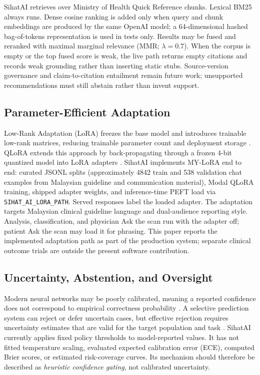 \documentclass[conference]{IEEEtran}
\begin{document}
SihatAI retrieves over Ministry of Health Quick Reference chunks. Lexical BM25 always runs. Dense cosine ranking is added only when query and chunk embeddings are produced by the same OpenAI model; a 64-dimensional hashed bag-of-tokens representation is used in tests only. Results may be fused and reranked with maximal marginal relevance (MMR; \(\lambda=0.7\)). When the corpus is empty or the top fused score is weak, the live path returns empty citations and records weak grounding rather than inserting static stubs. Source-version governance and claim-to-citation entailment remain future work; unsupported recommendations must still abstain rather than invent support.

\subsection{Parameter-Efficient Adaptation}

Low-Rank Adaptation (LoRA) freezes the base model and introduces trainable low-rank matrices, reducing trainable parameter count and deployment storage \cite{hu2022lora}. QLoRA extends this approach by back-propagating through a frozen 4-bit quantized model into LoRA adapters \cite{dettmers2023qlora}. SihatAI implements MY-LoRA end to end: curated JSONL splits (approximately 4842 train and 538 validation chat examples from Malaysian guideline and communication material), Modal QLoRA training, shipped adapter weights, and inference-time PEFT load via \texttt{SIHAT\_AI\_LORA\_PATH}. Served responses label the loaded adapter. The adaptation targets Malaysian clinical guideline language and dual-audience reporting style. Analysis, classification, and physician Ask the scan run with the adapter off; patient Ask the scan may load it for phrasing. This paper reports the implemented adaptation path as part of the production system; separate clinical outcome trials are outside the present software contribution.

\subsection{Uncertainty, Abstention, and Oversight}

Modern neural networks may be poorly calibrated, meaning a reported confidence does not correspond to empirical correctness probability \cite{guo2017calibration}. A selective prediction system can reject or defer uncertain cases, but effective rejection requires uncertainty estimates that are valid for the target population and task \cite{geifman2019selectivenet}. SihatAI currently applies fixed policy thresholds to model-reported values. It has not fitted temperature scaling, evaluated expected calibration error (ECE), computed Brier scores, or estimated risk-coverage curves. Its mechanism should therefore be described as \emph{heuristic confidence gating}, not calibrated uncertainty.
\end{document}

